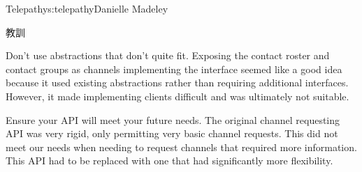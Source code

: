 \begin{aosachapter}{Telepathy}{s:telepathy}{Danielle Madeley}
\begin{aosasect1}{教訓}
\begin{aosadescription}
  \item{Don't use abstractions that don't quite fit.}  Exposing the
    contact roster and contact groups as channels implementing the
     interface seemed like a good idea because it used
    existing abstractions rather than requiring additional
    interfaces. However, it made implementing clients difficult and
    was ultimately not suitable.

  \item{Ensure your API will meet your future needs.}  The original
    channel requesting API was very rigid, only permitting very basic
    channel requests. This did not meet our needs when needing to
    request channels that required more information. This API had to
    be replaced with one that had significantly more flexibility.

\end{aosadescription}

\end{aosasect1}

\end{aosachapter}

